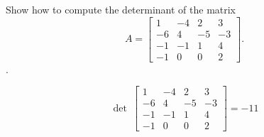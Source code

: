
\begin{exerciseStatement}


Show how to compute the determinant of the matrix \[A= \left[\begin{array}{cccc}
1 & -4 & 2 & 3 \\
-6 & 4 & -5 & -3 \\
-1 & -1 & 1 & 4 \\
-1 & 0 & 0 & 2
\end{array}\right] .\].


\end{exerciseStatement}
    
\begin{exerciseAnswer} 
\[\operatorname{det}\  \left[\begin{array}{cccc}
1 & -4 & 2 & 3 \\
-6 & 4 & -5 & -3 \\
-1 & -1 & 1 & 4 \\
-1 & 0 & 0 & 2
\end{array}\right] = -11 \]
\end{exerciseAnswer}
    

